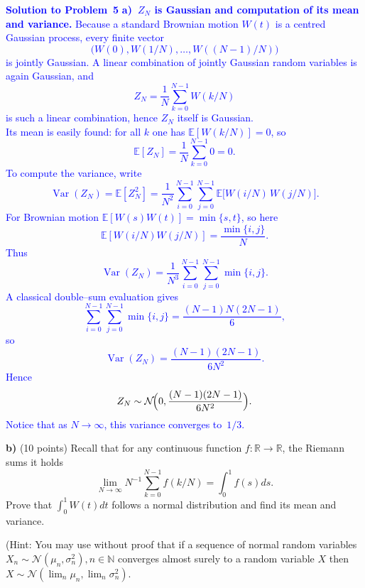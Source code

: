 \documentclass{article}
\begin{document}
\textcolor{blue}{
    \textbf{Solution to Problem 5}  
\textbf{a) $Z_N$ is Gaussian and computation of its mean and variance.}  
Because a standard Brownian motion $W(t)$ is a centred Gaussian process, every finite vector  
$$
\bigl(W(0),W(1/N),\dots,W((N-1)/N)\bigr)
$$
is jointly Gaussian.  A linear combination of jointly Gaussian random variables is again Gaussian, and  
$$
Z_N=\frac1N\sum_{k=0}^{N-1}W(k/N)
$$
is such a linear combination, hence $Z_N$ itself is Gaussian. \\
Its mean is easily found: for all $k$ one has $\mathbb{E}[W(k/N)]=0$, so  
$$
\mathbb{E}[Z_N]=\frac1N\sum_{k=0}^{N-1}0=0.
$$
To compute the variance, write  
$$
\operatorname{Var}(Z_N)=\mathbb{E}[Z_N^2]=\frac1{N^{2}}\sum_{i=0}^{N-1}\sum_{j=0}^{N-1}\mathbb{E}\!\bigl[W(i/N)\,W(j/N)\bigr].
$$
For Brownian motion $\mathbb{E}[W(s)W(t)]=\min\{s,t\}$, so here
$$
\mathbb{E}[W(i/N)W(j/N)]=\frac{\min\{i,j\}}N.
$$
Thus  
$$
\operatorname{Var}(Z_N)=\frac1{N^{3}}\sum_{i=0}^{N-1}\sum_{j=0}^{N-1}\min\{i,j\}.
$$
A classical double–sum evaluation gives  
$$
\sum_{i=0}^{N-1}\sum_{j=0}^{N-1}\min\{i,j\}=\frac{(N-1)N(2N-1)}6,
$$
so  
$$
\operatorname{Var}(Z_N)=\frac{(N-1)(2N-1)}{6N^{2}}.
$$
Hence  
$$
Z_N\sim\mathcal{N}\!\Bigl(0,\frac{(N-1)(2N-1)}{6N^{2}}\Bigr).
$$
Notice that as $N\to\infty$, this variance converges to $1/3$.
}


\textbf{b)}   (10 points) Recall that for any continuous function 
$f : \mathbb{R} \rightarrow \mathbb{R}$, the Riemann sums it holds
$$\lim_{N \rightarrow \infty} N^{-1} \sum_{k=0}^{N-1} f(k/N) = \int_0^1 f(s)ds.$$
Prove that 
$\int_0^1 W(t)dt$ 
follows a normal distribution and find its mean and variance.

(Hint: You may use without proof that if a sequence of normal random variables $X_n \sim \mathcal{N}(\mu_n, \sigma_n^2), n \in \mathbb{N}$ converges almost surely to a random variable $X$ then 
$X \sim \mathcal{N}(\lim_n \mu_n, \lim_n \sigma_n^2).$
\end{document}
